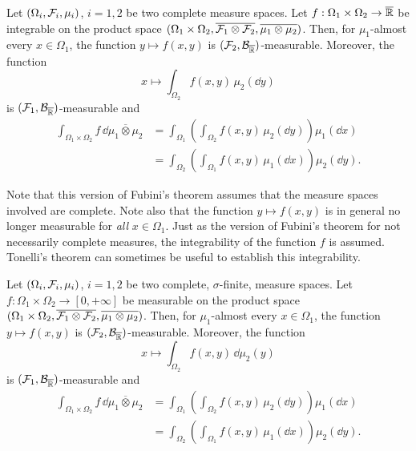 \begin{theorem}
Let $(\Omega_i, \mathcal F_i, \mu_i)$, $i=1,2$ be two complete measure spaces. 
Let $f : \Omega_1 \times \Omega_2 \to \overline{\mathbb R}$ be integrable on the product space $(\Omega_1 \times \Omega_2, \overline{\mathcal F_1 \otimes \mathcal F_2}, \overline{\mu_1 \otimes \mu_2})$. Then, for $\mu_1$-almost every $x \in \Omega_1$, the function $y \mapsto f(x, y)$ is $(\mathcal F_2,\mathcal B_{\overline{\mathbb R}})$-measurable. Moreover, the function 
\[
x \mapsto \int_{\Omega_2} f(x,y)\, \mu_2(\dd y)
\]
is $(\mathcal F_1,\mathcal B_{\overline{\mathbb R}})$-measurable and
\[
\begin{split}
\int_{\Omega_1 \times \Omega_2} f\, \dd \overline{\mu_1 \otimes \mu_2} 
&= \int_{\Omega_1} \left( \int_{\Omega_2 } f(x,  y ) \,\mu_2(\dd y) \right) \mu_1(\dd x)\\
&= \int_{\Omega_2} \left( \int_{\Omega_1} f(x, y) \,\mu_1(\dd x) \right) \mu_2(\dd y).
\end{split}
\] 	
\end{theorem}

Note that this version of Fubini's theorem assumes that the measure spaces involved are complete. 
Note also that the function $y \mapsto f(x,y)$ is in general no longer measurable for \emph{all} $x \in \Omega_1$. Just as the version of Fubini's theorem for not necessarily complete measures, the integrability of the function $f$ is assumed. Tonelli's theorem can sometimes be useful to establish this integrability.

\begin{theorem}
	Let $(\Omega_i, \mathcal F_i, \mu_i)$, $i=1,2$ be two complete, $\sigma$-finite, measure spaces. 
	Let $f : \Omega_1 \times \Omega_2 \to [0,+\infty]$ be measurable on the product space $(\Omega_1 \times \Omega_2, \overline{\mathcal F_1 \otimes \mathcal F_2}, \overline{\mu_1 \otimes \mu_2})$. Then, for $\mu_1$-almost every $x \in \Omega_1$, the function $y \mapsto f(x, y)$ is $(\mathcal F_2,\mathcal B_{\overline{\mathbb R}})$-measurable. Moreover, the function 
	\[
	x \mapsto \int_{\Omega_2} f(x,y)\, \dd \mu_2(y)
	\]
	is $(\mathcal F_1,\mathcal B_{\overline{\mathbb R}})$-measurable and
	\[
	\begin{split}
	\int_{\Omega_1 \times \Omega_2} f \,\dd \overline{\mu_1 \otimes \mu_2} 
	&= \int_{\Omega_1} \left( \int_{\Omega_2 } f(x,  y ) \,\mu_2(\dd y) \right) \mu_1(\dd x)\\
	&= \int_{\Omega_2} \left( \int_{\Omega_1} f(x, y)  \,\mu_1(\dd x) \right) \mu_2(\dd y).
	\end{split}
	\] 	
\end{theorem}

